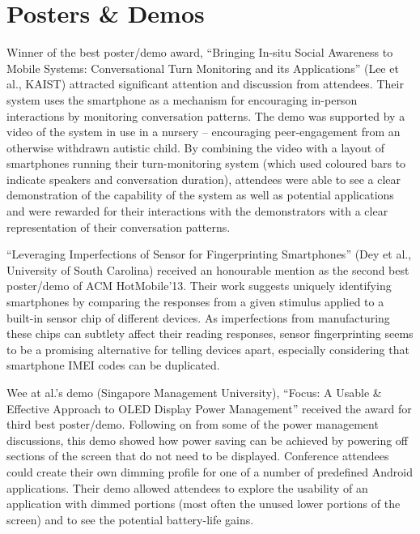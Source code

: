 \section{Posters \& Demos}
\label{sec:postersdemos}
Winner of the best poster\slash demo award, ``Bringing In-situ Social Awareness to Mobile 
Systems: Conversational Turn Monitoring and its Applications'' (Lee et al., 
KAIST) attracted significant attention and discussion from attendees. Their 
system uses the smartphone as a mechanism for encouraging in-person interactions
by monitoring conversation patterns. The demo was supported by a video of the 
system in use in a nursery -- encouraging peer-engagement from an otherwise 
withdrawn autistic child. By combining the video with a layout of smartphones 
running their turn-monitoring system (which used coloured bars to indicate 
speakers and conversation duration), attendees were able to see a clear 
demonstration of the capability of the system as well as potential applications
and were rewarded for their interactions with the demonstrators with a clear
representation of their conversation patterns.

``Leveraging Imperfections of Sensor for Fingerprinting Smartphones''
(Dey et al., University of South Carolina) received an honourable mention
as the second best poster\slash demo of ACM HotMobile'13. Their work suggests
uniquely identifying smartphones by comparing the responses from a given
stimulus applied to a built-in sensor chip of different devices. As
imperfections from manufacturing these chips can subtlety affect their
reading responses, sensor fingerprinting seems to be a promising
alternative for telling devices apart, especially considering that
smartphone IMEI codes can be duplicated.

Wee at al.'s demo (Singapore Management University), ``Focus: A Usable \&
Effective Approach to OLED Display Power Management'' received the award
for third best poster\slash demo. Following on from some of the power
management discussions, this demo showed how power saving can be achieved
by powering off sections of the screen that do not need to be displayed.
Conference attendees could create their own dimming profile for one of a
number of predefined Android applications. Their demo allowed attendees to
explore the usability of an application with dimmed portions (most often
the unused lower portions of the screen) and to see the potential
battery-life gains.
